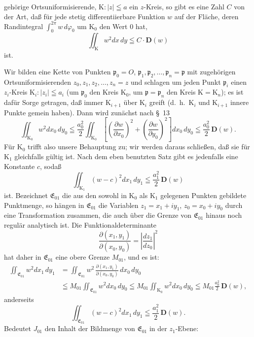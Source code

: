\documentclass{article}
\begin{document}
gehörige Ortsuniformisierende, $\mathrm{K} : |z| \leqq a$ ein $z$-Kreis, so gibt es eine Zahl $C$ von der Art, daß für jede stetig differentiierbare Funktion $w$ auf der Fläche, deren Randintegral $\displaystyle\int_0^{2\pi} w\,d\varphi_0$ um $\mathrm{K}_0$ den Wert $0$ hat,
\[ \iint_{\mathrm{K}} w^2 dx\,dy \leqq C \cdot \mathbf{D}(w) \]
ist.

Wir bilden eine Kette von Punkten $\mathfrak{p}_0 = O$, $\mathfrak{p}_1, \mathfrak{p}_2, \dots, \mathfrak{p}_n = \mathfrak{p}$ mit zugehörigen Ortsuniformisierenden $z_0, z_1, z_2, \dots, z_n = z$ und schlagen um jeden Punkt $\mathfrak{p}_i$ einen $z_i$-Kreis $\mathrm{K}_i : |z_i| \leqq a_i$ (um $\mathfrak{p}_0$ den Kreis $\mathrm{K}_0$, um $\mathfrak{p} = \mathfrak{p}_n$ den Kreis $\mathrm{K} = \mathrm{K}_n$); es ist dafür Sorge getragen, daß immer $\mathrm{K}_{i+1}$ über $\mathrm{K}_i$ greift (d.~h.\ $\mathrm{K}_i$ und $\mathrm{K}_{i+1}$ innere Punkte gemein haben). Dann wird zunächst nach §~13
\[ \iint_{\mathrm{K}_0} w^2 dx_0\,dy_0 \leqq \frac{a_0^2}{2} \iint_{\mathrm{K}_0} \left[ \left(\frac{\partial w}{\partial x_0}\right)^2 + \left(\frac{\partial w}{\partial y_0}\right)^2 \right] dx_0\,dy_0 \leqq \frac{a_0^2}{2}\,\mathbf{D}(w). \]
Für $\mathrm{K}_0$ trifft also unsere Behauptung zu; wir werden daraus schließen, daß sie für $\mathrm{K}_1$ gleichfalls gültig ist. Nach dem eben benutzten Satz gibt es jedenfalls eine Konstante $c$, sodaß
\[ \iint_{\mathrm{K}_1} (w - c)^2 dx_1\,dy_1 \leqq \frac{a_1^2}{2}\,\mathbf{D}(w) \]
ist. Bezeichnet $\mathfrak{E}_{01}$ die aus den sowohl in $\mathrm{K}_0$ als $\mathrm{K}_1$ gelegenen Punkten gebildete Punktmenge, so hängen in $\mathfrak{E}_{01}$ die Variablen $z_1 = x_1 + i y_1$, $z_0 = x_0 + i y_0$ durch eine Transformation zusammen, die auch über die Grenze von $\mathfrak{E}_{01}$ hinaus noch regulär analytisch ist. Die Funktionaldeterminante
\[ \frac{\partial(x_1, y_1)}{\partial(x_0, y_0)} = \left| \frac{dz_1}{dz_0} \right|^2 \]
hat daher in $\mathfrak{E}_{01}$ eine obere Grenze $M_{01}$, und es ist:
\[ \begin{aligned}
\iint_{\mathfrak{E}_{01}} w^2 dx_1\,dy_1 &= \iint_{\mathfrak{E}_{01}} w^2\,\frac{\partial(x_1, y_1)}{\partial(x_0, y_0)}\,dx_0\,dy_0 \\
&\leqq M_{01} \iint_{\mathfrak{E}_{01}} w^2 dx_0\,dy_0 \leqq M_{01} \iint_{\mathrm{K}_0} w^2 dx_0\,dy_0 \leqq M_{01} \frac{a_0^2}{2}\,\mathbf{D}(w),
\end{aligned} \tag{31} \]
anderseits
\[ \iint_{\mathfrak{E}_{01}} (w - c)^2 dx_1\,dy_1 \leqq \frac{a_1^2}{2}\,\mathbf{D}(w). \tag{32} \]
Bedeutet $J_{01}$ den Inhalt der Bildmenge von $\mathfrak{E}_{01}$ in der $z_1$-Ebene:
\end{document}

